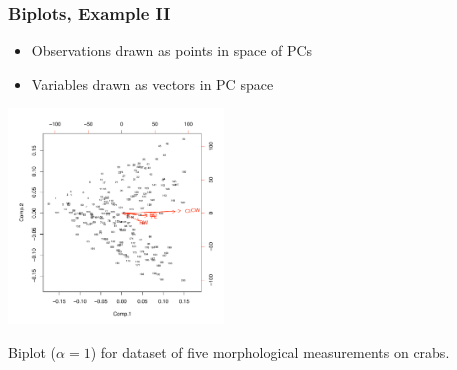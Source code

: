 \documentclass{beamer}
\begin{document}


\begin{frame}
  \frametitle{Biplots, Example II}
\begin{itemize}
\item Observations drawn as points in space of PCs
\item Variables drawn as vectors in PC space
\end{itemize}

\begin{center}
\includegraphics[height=2.25in]{crab-biplot}

{\footnotesize Biplot ($\alpha=1$) for dataset of five morphological measurements on crabs.}
\end{center}


\end{frame}

\end{document}

